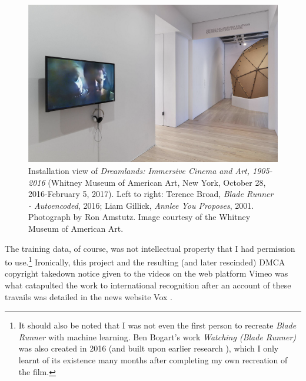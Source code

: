 \begin{figure}[!htb]
    \centering
    \captionsetup{justification=centering}
    \includegraphics[width=1\textwidth]{figures/c1_intro/whitney-installation-shot.png}
    \caption[Installation shot of \textit{Blade Runner --- Autoencoded}]{Installation view of \textit{Dreamlands: Immersive Cinema and Art, 1905-2016} (Whitney Museum of American Art, New York, October 28, 2016-February 5, 2017). Left to right: Terence Broad, \textit{Blade Runner - Autoencoded}, 2016; Liam Gillick, \textit{Annlee You Proposes}, 2001. Photograph by Ron Amstutz. Image courtesy of the Whitney Museum of American Art.}
    \label{fig:c1:blade-runner-whitney}
\end{figure}

The training data, of course, was not intellectual property that I had permission to use.\footnote{It should also be noted that I was not even the first person to recreate \textit{Blade Runner} with machine learning. Ben Bogart's work \textit{Watching (Blade Runner)} was also created in 2016 \citep{bogart2016watching} (and built upon earlier research \citep{bogart2008memory,bogart2013context}), which I only learnt of its existence many months after completing my own recreation of the film.}
Ironically, this project and the resulting (and later rescinded) DMCA copyright takedown notice given to the videos on the web platform Vimeo was what catapulted the work to international recognition after an account of these travails was detailed in the news website Vox \citep{romano2016bladerunner}.

